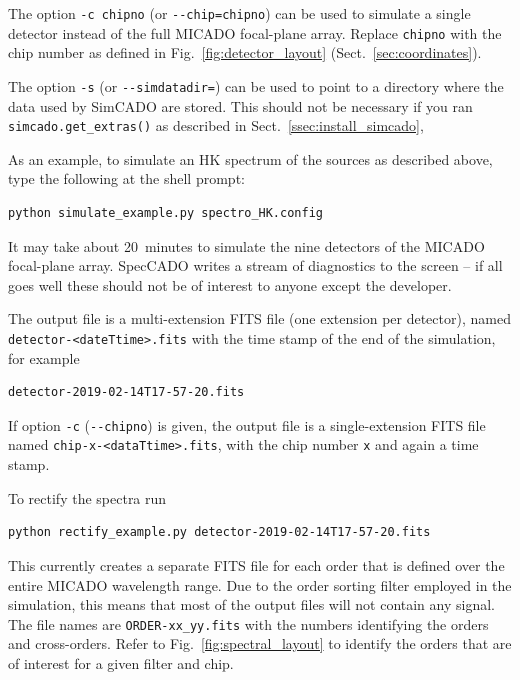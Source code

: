 \documentclass[a4paper,twoside,11pt]{article}
\begin{document}
The option \lstinline{-c chipno} (or \lstinline{--chip=chipno}) can be
used to simulate a single detector instead of the full MICADO
focal-plane array. Replace \lstinline{chipno} with the chip number as
defined in Fig.~\ref{fig:detector_layout}
(Sect.~\ref{sec:coordinates}).

The option \lstinline{-s} (or \lstinline{--simdatadir=}) can be used
to point to a directory where the data used by SimCADO are
stored. This should not be necessary if you ran
\lstinline{simcado.get_extras()} as described in
Sect.~\ref{ssec:install_simcado},


As an example, to simulate an HK spectrum of the sources as described
above, type the following at the shell prompt:
\begin{lstlisting}[style=csh]
python simulate_example.py spectro_HK.config
\end{lstlisting}
It may take about 20~minutes to simulate the nine detectors of the
MICADO focal-plane array. SpecCADO writes a stream of diagnostics to
the screen -- if all goes well these should not be of interest to
anyone except the developer.

The output file is a multi-extension FITS file (one extension per
detector), named \lstinline{detector-<dateTtime>.fits} with the time
stamp of the end of the simulation, for example
\begin{lstlisting}[style=csh]
detector-2019-02-14T17-57-20.fits
\end{lstlisting}
If option \lstinline{-c} (\lstinline{--chipno}) is given, the output
file is a single-extension FITS file named
\lstinline{chip-x-<dataTtime>.fits}, with the chip number
\lstinline{x} and again a time stamp.

To rectify the spectra run
\begin{lstlisting}[style=csh]
python rectify_example.py detector-2019-02-14T17-57-20.fits
\end{lstlisting}
This currently creates a separate FITS file for each order that is
defined over the entire MICADO wavelength range. Due to the order
sorting filter employed in the simulation, this means that most of the
output files will not contain any signal. The file names are
\lstinline{ORDER-xx_yy.fits} with the numbers identifying the orders
and cross-orders. Refer to Fig.~\ref{fig:spectral_layout} to identify
the orders that are of interest for a given filter and chip.
\end{document}
